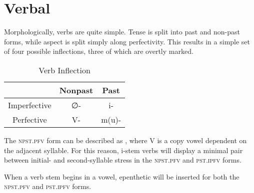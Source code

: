 \chapter{Verbal}

Morphologically, verbs are quite simple. Tense is split into past and non-past forms, while aspect is split simply along perfectivity. This results in a simple set of four possible inflections, three of which are overtly marked.

\begin{table}[ht]
  \centering
  \begin{tabular}{*{3}{c}}
    \toprule
                 & Nonpast & Past  \\\midrule
    Imperfective & ∅-      & i-    \\
    Perfective   & V-      & m(u)- \\
    \bottomrule
  \end{tabular}
  \caption{Verb Inflection}
  \label{table:verb-inflection}
\end{table}

The \textsc{npst.pfv} form can be described as , where V is a copy vowel dependent on the adjacent syllable. For this reason, i-stem verbs will display a minimal pair between initial- and second-syllable stress in the \textsc{npst.pfv} and \textsc{pst.ipfv} forms.

When a verb stem begins in a vowel, epenthetic  will be inserted for both the \textsc{npst.pfv} and \textsc{pst.ipfv} forms.
